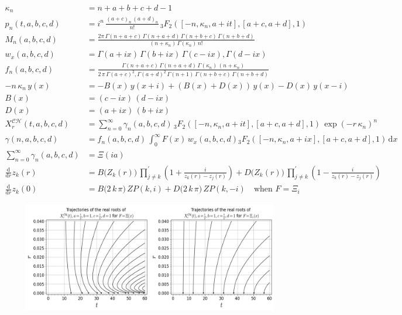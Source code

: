 \documentclass[a4paper,11pt,twoside]{amsart}
\begin{document}
\begin{small}
{\begin{minipage}{\textwidth}
\begin{align}
  \kappa_n &= n + a + b + c + d - 1 \\
  p_n(t,a,b,c,d) &= i^n\,\frac{(a+c)_n\,(a+d)_n}{n!}\,{}_3F_2\left([-n, \kappa_n, a+it],[a+c,a+d],1\right) \\
  M_n(a,b,c,d) &= \frac{2\pi\,\Gamma(n+a+c)\,\Gamma(n+a+d)\,\Gamma(n+b+c)\,\Gamma(n+b+d)}{(n+\kappa_n)\,\Gamma(\kappa_n)\,n!} \\
  w_x(a,b,c,d) &= \Gamma(a+ix)\,\Gamma(b+ix)\,\Gamma(c-ix),\Gamma(d-ix) \\
  f_n(a,b,c,d) &= \frac{\Gamma(n+a+c)\,\Gamma(n+a+d)\,\Gamma(\kappa_n)\,(n+\kappa_n)}{2\,\pi\,\Gamma(a+c)^2,\Gamma(a+d)^2\,\Gamma(n+1)\,\Gamma(n+b+c)\,\Gamma(n+b+d)} \\
 -n\,\kappa_n\,y(x) &= -B(x)\,y(x+i)+\left(B(x)+D(x)\right)\,y(x)-D(x)\,y(x-i) \\
  B(x)&=(c-ix)\,(d-ix) \\
  D(x)&=(a+ix)\,(b+ix) \\
  X^\mathcal{CH}_r(t,a,b,c,d) &= \sum_{n=0}^\infty \gamma_n(a,b,c,d)\,{}_3F_2\left([-n, \kappa_n, a+it],[a+c,a+d],1\right)\,\exp\left(-r\,\kappa_n\right)^n \\ 
  \gamma(n,a,b,c,d) &= f_n(a,b,c,d)\,\int_{0}^{\infty} F(x)\,w_x(a,b,c,d) {}_3F_2\left([-n, \kappa_n, a+ix],[a+c,a+d],1\right)\,\mathrm{d}x \\
  \sum_{n=0}^\infty \gamma_n(a,b,c,d) &= \Xi(ia) \\
  \frac{\mathrm{d}}{\mathrm{d} r} z_k(r)&=B\big(Z_k(r)\big)\,\prod_{j \ne k}^{'} \left(1+\frac{i}{z_k(r)-z_j(r)}\right)+D\big(Z_k(r)\big)\,\prod_{j \ne k}^{'} \left(1-\frac{i}{z_k(r)-z_j(r)}\right) \\
  \frac{\mathrm{d}}{\mathrm{d} r} z_k(0)&= B\big(2\,k\,\pi\big)\,ZP(k,i)+D\big(2\,k\,\pi)\,ZP(k,-i)\quad \text{when } F=\Xi_i 
\end{align}
\end{minipage}}
\begin{figure}[H]
  \includegraphics[width=1\linewidth]{ContHahnFlowdouble.jpeg}

\end{figure}
\end{small}
\end{document}
